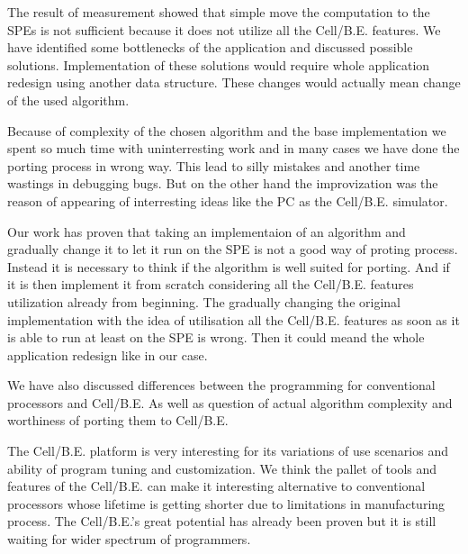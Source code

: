 \par
The result of measurement showed that simple move the computation to the SPEs is not sufficient because it does not utilize all the \mbox{Cell/B.E.} features.
We have identified some bottlenecks of the application and discussed possible solutions.
Implementation of these solutions would require whole application redesign using another data structure.
These changes would actually mean change of the used algorithm.

\par
Because of complexity of the chosen algorithm and the base implementation we spent so much time with uninterresting work and in many cases we have done the porting process in wrong way.
This lead to silly mistakes and another time wastings in debugging bugs.
But on the other hand the improvization was the reason of appearing of interresting ideas like the PC as the \mbox{Cell/B.E.} simulator.

\par
Our work has proven that taking an implementaion of an algorithm and gradually change it to let it run on the SPE is not a good way of proting process.
Instead it is necessary to think if the algorithm is well suited for porting.
And if it is then implement it from scratch considering all the \mbox{Cell/B.E.} features utilization already from beginning.
The gradually changing the original implementation with the idea of utilisation all the \mbox{Cell/B.E.} features as soon as it is able to run at least on the SPE is wrong.
Then it could meand the whole application redesign like in our case.

\par
We have also discussed differences between the programming for conventional processors and \mbox{Cell/B.E.}
As well as question of actual algorithm complexity and worthiness of porting them to \mbox{Cell/B.E.}

\par
The \mbox{Cell/B.E.} platform is very interesting for its variations of use scenarios and ability of program tuning and customization.
We think the pallet of tools and features of the \mbox{Cell/B.E.} can make it interesting alternative to conventional processors whose lifetime is getting shorter due to limitations in manufacturing process.
The \mbox{Cell/B.E.}'s great potential has already been proven but it is still waiting for wider spectrum of programmers.

